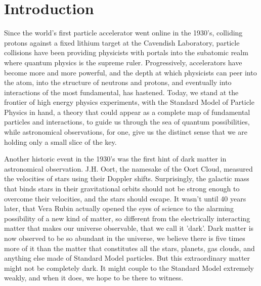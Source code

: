 \chapter{Introduction}

Since the world's first particle accelerator went online in the 1930's, colliding protons against a fixed lithium target at the Cavendish Laboratory, particle collisions have been providing physicists with portals into the subatomic realm where quantum physics is the supreme ruler.  Progressively, accelerators have become more and more powerful, and the depth at which physicists can peer into the atom, into the structure of neutrons and protons, and eventually into interactions of the most fundamental, has hastened.  Today, we stand at the frontier of high energy physics experiments, with the Standard Model of Particle Physics in hand, a theory that could appear as a complete map of fundamental particles and interactions, to guide us through the sea of quantum possibilities, while astronomical observations, for one, give us the distinct sense that we are holding only a small slice of the key.  

Another historic event in the 1930's was the first hint of dark matter in astronomical observation.  J.H. Oort, the namesake of the Oort Cloud, measured the velocities of stars using their Doppler shifts.  Surprisingly, the galactic mass that binds stars in their gravitational orbits should not be strong enough to overcome their velocities, and the stars should escape.  It wasn't until 40 years later, that Vera Rubin actually opened the eyes of science to the alarming possibility of a new kind of matter, so different from the electrically interacting matter that makes our universe observable, that we call it 'dark'.  Dark matter is now observed to be so abundant in the universe, we believe there is five times more of it than the matter that constitutes all the stars, planets, gas clouds, and anything else made of Standard Model particles.  But this extraordinary matter might not be completely dark.  It might couple to the Standard Model extremely weakly, and when it does, we hope to be there to witness.


